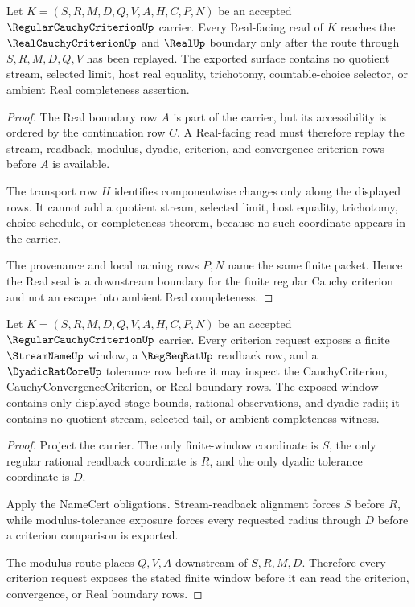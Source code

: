 \begin{theorem}
\label{thm:regular-cauchy-criterion-real-seal-nonescape}
Let $K=(S,R,M,D,Q,V,A,H,C,P,N)$ be an accepted $\RegularCauchyCriterionUp$ carrier. Every Real-facing read of $K$ reaches the $\RealCauchyCriterionUp$ and $\RealUp$ boundary only after the route through $S,R,M,D,Q,V$ has been replayed. The exported surface contains no quotient stream, selected limit, host real equality, trichotomy, countable-choice selector, or ambient Real completeness assertion.
\end{theorem}
\begin{proof}
The Real boundary row $A$ is part of the carrier, but its accessibility is ordered by the continuation row $C$. A Real-facing read must therefore replay the stream, readback, modulus, dyadic, criterion, and convergence-criterion rows before $A$ is available.

The transport row $H$ identifies componentwise changes only along the displayed rows. It cannot add a quotient stream, selected limit, host equality, trichotomy, choice schedule, or completeness theorem, because no such coordinate appears in the carrier.

The provenance and local naming rows $P,N$ name the same finite packet. Hence the Real seal is a downstream boundary for the finite regular Cauchy criterion and not an escape into ambient Real completeness.
\end{proof}

\begin{theorem}
\label{thm:regular-cauchy-criterion-window-obligations}
Let $K=(S,R,M,D,Q,V,A,H,C,P,N)$ be an accepted $\RegularCauchyCriterionUp$ carrier. Every criterion request exposes a finite $\StreamNameUp$ window, a $\RegSeqRatUp$ readback row, and a $\DyadicRatCoreUp$ tolerance row before it may inspect the CauchyCriterion, CauchyConvergenceCriterion, or Real boundary rows. The exposed window contains only displayed stage bounds, rational observations, and dyadic radii; it contains no quotient stream, selected tail, or ambient completeness witness.
\end{theorem}
\begin{proof}
Project the carrier. The only finite-window coordinate is $S$, the only regular rational readback coordinate is $R$, and the only dyadic tolerance coordinate is $D$.

Apply the NameCert obligations. Stream-readback alignment forces $S$ before $R$, while modulus-tolerance exposure forces every requested radius through $D$ before a criterion comparison is exported.

The modulus route places $Q,V,A$ downstream of $S,R,M,D$. Therefore every criterion request exposes the stated finite window before it can read the criterion, convergence, or Real boundary rows.
\end{proof}

